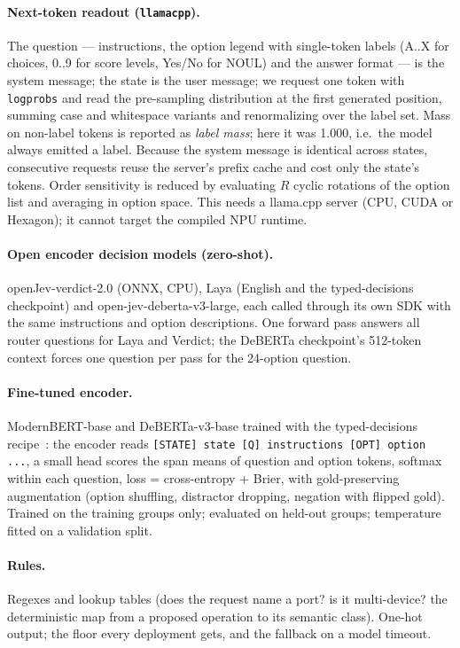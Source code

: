 \documentclass[11pt]{article}
\begin{document}
\paragraph{Next-token readout (\texttt{llamacpp}).} The question --- instructions, the option
legend with single-token labels (A..X for choices, 0..9 for score levels, Yes/No for NOUL) and
the answer format --- is the system message; the state is the user message; we request one
token with \texttt{logprobs} and read the pre-sampling distribution at the first generated
position, summing case and whitespace variants and renormalizing over the label set. Mass on
non-label tokens is reported as \emph{label mass}; here it was 1.000, i.e.\ the model always
emitted a label. Because the system message is identical across states, consecutive requests
reuse the server's prefix cache and cost only the state's tokens. Order sensitivity is reduced by
evaluating $R$ cyclic rotations of the option list and averaging in option space. This needs a
llama.cpp server (CPU, CUDA or Hexagon); it cannot target the compiled NPU runtime.

\paragraph{Open encoder decision models (zero-shot).} openJev-verdict-2.0 (ONNX, CPU), Laya
(English and the typed-decisions checkpoint) and open-jev-deberta-v3-large, each called through
its own SDK with the same instructions and option descriptions. One forward pass answers all
router questions for Laya and Verdict; the DeBERTa checkpoint's 512-token context forces one
question per pass for the 24-option question.

\paragraph{Fine-tuned encoder.} ModernBERT-base and DeBERTa-v3-base trained with the
typed-decisions recipe~\cite{openjevdeberta}: the encoder reads
\texttt{[STATE] state [Q] instructions [OPT] option ...}, a small head scores the span means of
question and option tokens, softmax within each question, loss = cross-entropy + Brier, with
gold-preserving augmentation (option shuffling, distractor dropping, negation with flipped gold).
Trained on the training groups only; evaluated on held-out groups; temperature fitted on a
validation split.

\paragraph{Rules.} Regexes and lookup tables (does the request name a port? is it multi-device?
the deterministic map from a proposed operation to its semantic class). One-hot output; the
floor every deployment gets, and the fallback on a model timeout.
\end{document}
